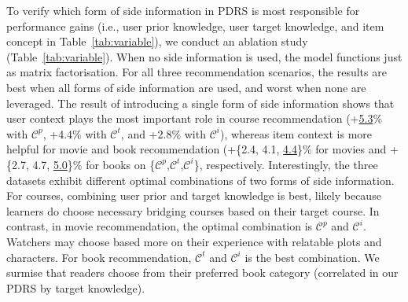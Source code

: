 To verify which form of side information in PDRS is most responsible for performance gains (i.e., user prior knowledge, user target knowledge, and item concept in Table~\ref{tab:variable}), we conduct an ablation study (Table~\ref{tab:variable}). When no side information is used, the model functions just as matrix factorisation. For all three recommendation scenarios, the results are best when all forms of side information are used, and worst when none are leveraged. The result of introducing a single form of side information shows that user context plays the most important role in course recommendation (+\underline{5.3}\% with $\mathcal{C}^p$, +4.4\% with $\mathcal{C}^t$, and +2.8\% with $\mathcal{C}^i$), whereas item context is more helpful for movie and book recommendation 
(+\{2.4, 4.1, \underline{4.4}\}\% for movies and +\{2.7, 4.7, \underline{5.0}\}\% for books on \{$\mathcal{C}^p$,$\mathcal{C}^t$,$\mathcal{C}^i$\}, respectively.
Interestingly, the three datasets exhibit different optimal combinations of two forms of side information. For courses, combining user prior and target knowledge is best, likely because learners do choose necessary bridging courses based on their target course.  In contrast, in movie recommendation, the optimal combination is $\mathcal{C}^p$ and $\mathcal{C}^i$. Watchers may choose based more on their experience with relatable plots and characters.  For book recommendation, $\mathcal{C}^t$ and $\mathcal{C}^i$ is the best combination. We surmise that readers choose from their preferred book category (correlated in our PDRS by target knowledge).  
